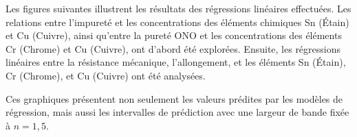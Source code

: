 \documentclass[12pt]{article}
\begin{document}
Les figures suivantes illustrent les résultats des régressions linéaires 
effectuées. Les relations entre l'impureté et les concentrations des 
éléments chimiques Sn (Étain) et Cu (Cuivre), ainsi qu'entre la pureté 
ONO et les concentrations des éléments Cr (Chrome) et Cu (Cuivre), ont 
d'abord été explorées. Ensuite, les régressions linéaires entre la 
résistance mécanique, l'allongement, et les éléments Sn (Étain), Cr 
(Chrome), et Cu (Cuivre) ont été analysées.

Ces graphiques présentent non seulement les valeurs prédites par les 
modèles de régression, mais aussi les intervalles de prédiction avec 
une largeur de bande fixée à $n=1,5$. 



\end{document}

